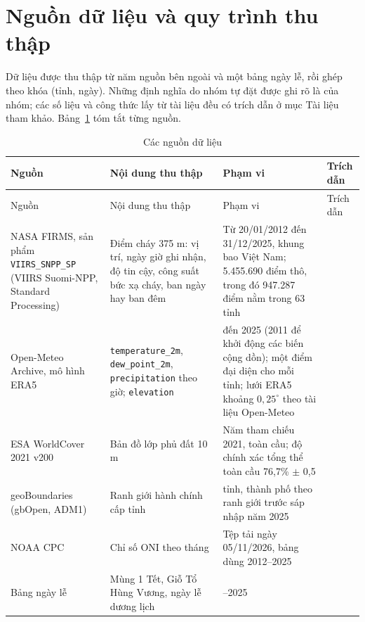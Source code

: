 \documentclass[12pt,a4paper]{article}
\begin{document}
\section{Nguồn dữ liệu và quy trình thu thập}

Dữ liệu được thu thập từ năm nguồn bên ngoài và một bảng ngày lễ, rồi ghép theo khóa (tỉnh, ngày). Những định nghĩa do nhóm tự đặt được ghi rõ là của nhóm; các số liệu và công thức lấy từ tài liệu đều có trích dẫn ở mục Tài liệu tham khảo. Bảng~\ref{tab:sources} tóm tắt từng nguồn.

\begingroup
\small
\begin{longtable}{@{}>{\raggedright\arraybackslash}p{2.7cm}>{\raggedright\arraybackslash}p{4.3cm}>{\raggedright\arraybackslash}p{4.7cm}>{\raggedright\arraybackslash}p{2.0cm}@{}}
\caption{Các nguồn dữ liệu}\label{tab:sources}\\
\toprule
Nguồn & Nội dung thu thập & Phạm vi & Trích dẫn \\
\midrule
\endfirsthead
\toprule
Nguồn & Nội dung thu thập & Phạm vi & Trích dẫn \\
\midrule
\endhead
\bottomrule
\endfoot
NASA FIRMS, sản phẩm \texttt{VIIRS\_SNPP\_SP} (VIIRS Suomi-NPP, Standard Processing) & Điểm cháy 375 m: vị trí, ngày giờ ghi nhận, độ tin cậy, công suất bức xạ cháy, ban ngày hay ban đêm & Từ 20/01/2012 đến 31/12/2025, khung bao Việt Nam; 5.455.690 điểm thô, trong đó 947.287 điểm nằm trong 63 tỉnh & \cite{schroeder2014,firms} \\
Open-Meteo Archive, mô hình ERA5 & \texttt{temperature\_2m}, \texttt{dew\_point\_2m}, \texttt{precipitation} theo giờ; \texttt{elevation} & 2011 đến 2025 (2011 để khởi động các biến cộng dồn); một điểm đại diện cho mỗi tỉnh; lưới ERA5 khoảng $0{,}25^\circ$ theo tài liệu Open-Meteo & \cite{hersbach2020,openmeteo} \\
ESA WorldCover 2021 v200 & Bản đồ lớp phủ đất 10 m & Năm tham chiếu 2021, toàn cầu; độ chính xác tổng thể toàn cầu 76,7\% $\pm$ 0,5 & \cite{zanaga2022} \\
geoBoundaries (gbOpen, ADM1) & Ranh giới hành chính cấp tỉnh & 63 tỉnh, thành phố theo ranh giới trước sáp nhập năm 2025 & \cite{runfola2020} \\
NOAA CPC & Chỉ số ONI theo tháng & Tệp tải ngày 05/11/2026, bảng dùng 2012--2025 & \cite{noaaoni} \\
Bảng ngày lễ & Mùng 1 Tết, Giỗ Tổ Hùng Vương, ngày lễ dương lịch & 2012--2025 & \cite{bllđ2019} \\
\end{longtable}
\endgroup
\end{document}
